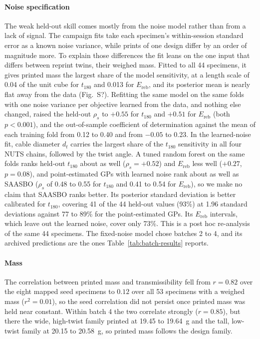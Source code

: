 \documentclass[11pt]{article}
\providecommand{\siref}[1]{S?}
\begin{document}
\paragraph{Noise specification} The weak held-out skill comes mostly
from the noise model rather than from a lack of signal. The campaign
fits take each specimen's within-session standard error as a known noise
variance, while prints of one design differ by an order of magnitude
more. To explain those differences the fit leans on the one input that
differs between reprint twins, their weighed mass. Fitted to all 44
specimens, it gives printed mass the largest share of the model
sensitivity, at a length scale of 0.04 of the unit cube for $t_{180}$
and 0.013 for $E_{\mathrm{reb}}$, and its posterior mean is nearly flat
away from the data (Fig.~\siref{fig:si-importance}). Refitting the same
model on the same folds with one noise variance per objective learned
from the data, and nothing else changed, raised the held-out $\rho_s$
to $+0.55$ for $t_{180}$ and $+0.51$ for $E_{\mathrm{reb}}$ (both
$p < 0.001$), and the out-of-sample coefficient of determination against
the mean of each training fold from 0.12 to 0.40 and from $-0.05$ to
0.23. In the learned-noise fit, cable diameter $d_t$ carries the largest
share of the $t_{180}$ sensitivity in all four NUTS chains, followed by
the twist angle. A tuned random forest on the same folds ranks held-out
$t_{180}$ about as well ($\rho_s = +0.52$) and $E_{\mathrm{reb}}$ less
well ($+0.27$, $p = 0.08$), and point-estimated GPs with learned noise
rank about as well as SAASBO ($\rho_s$ of 0.48 to 0.55 for $t_{180}$ and
0.41 to 0.54 for $E_{\mathrm{reb}}$), so we make no claim that SAASBO
ranks better. Its posterior standard deviation is better calibrated for
$t_{180}$, covering 41 of the 44 held-out values (93\%) at 1.96
standard deviations against 77 to 89\% for the point-estimated GPs. Its
$E_{\mathrm{reb}}$ intervals, which leave out the learned noise, cover
only 73\%. This is a
post hoc re-analysis of the same 44 specimens. The fixed-noise model
chose batches 2 to 4, and its archived predictions are the ones
Table~\ref{tab:batch-results} reports.

\paragraph{Mass} The correlation between printed mass and
transmissibility fell from $r = 0.82$ over the eight mapped seed
specimens to $0.12$ over all 53 specimens with a weighed mass ($r^2 = 0.01$), so the
seed correlation did not persist once printed mass was held near
constant. Within batch 4 the two correlate strongly
($r = 0.85$), but there the wide, high-twist family printed at 19.45 to
\SI{19.64}{g} and the tall, low-twist family at 20.15 to
\SI{20.58}{g}, so printed mass follows the design family.
\end{document}
